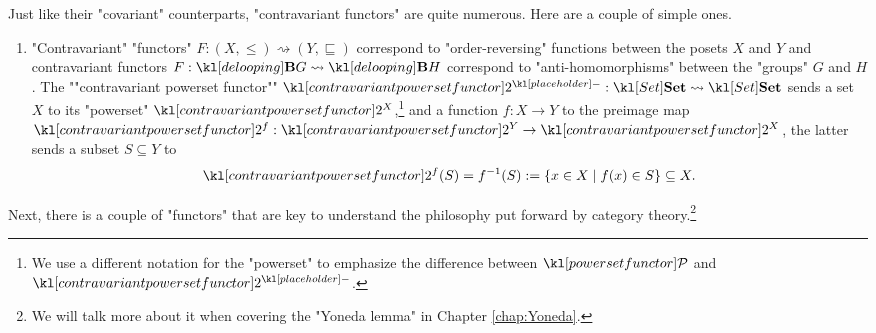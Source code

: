 \documentclass[main.tex]{subfiles}
\begin{document}
\begin{exmps}
	Just like their "covariant" counterparts, "contravariant functors" are quite numerous. Here are a couple of simple ones.
	\begin{enumerate}
		\item "Contravariant" "functors" $F: (X, \leq) \rightsquigarrow (Y, \sqsubseteq)$ correspond to "order-reversing" functions between the posets $X$ and $Y$ and contravariant functors $F: \deloop{G}\rightsquigarrow \deloop{H}$ correspond to "anti-homomorphisms" between the "groups" $G$ and $H$.
		\itemAP The ""contravariant powerset functor"" $\mPcontr{\placeholder}: \catSet \rightsquigarrow \catSet$ sends a set $X$ to its "powerset" $\mPcontr{X}$,\footnote{We use a different notation for the "powerset" to emphasize the difference between $\mPcov$ and $\mPcontr{\placeholder}$.} and a function $f: X\rightarrow Y$ to the preimage map $\mPcontr{f}:\mPcontr{Y}\rightarrow \mPcontr{X}$, the latter sends a subset $S\subseteq Y$ to \[\mPcontr{f}(S) = f^{-1}(S) := \{x \in X \mid f(x) \in S\} \subseteq X.\]
	\end{enumerate}
\end{exmps}
Next, there is a couple of "functors" that are key to understand the philosophy put forward by category theory.\footnote{We will talk more about it when covering the "Yoneda lemma" in Chapter \ref{chap:Yoneda}.}
\end{document}
